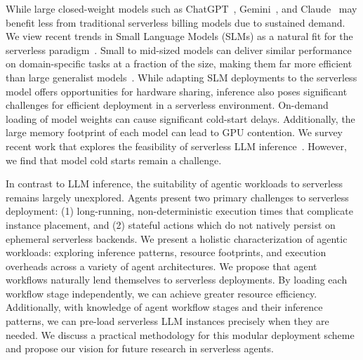 While large closed-weight models such as ChatGPT~\cite{chatgpt}, Gemini~\cite{gemini}, and Claude~\cite{claude} 
may benefit less from traditional serverless billing models due to sustained demand.
We view recent trends in Small Language Models (SLMs) as a natural fit for the serverless paradigm~\cite{belcak2025smalllanguagemodelsfuture, rios2025huggingface}.
Small to mid-sized models can deliver similar performance on domain-specific tasks at a fraction of the size, making them far more efficient than large generalist models~\cite{belcak2025smalllanguagemodelsfuture}.
While adapting SLM deployments to the serverless model offers opportunities for hardware sharing, inference also poses significant challenges for efficient deployment in a serverless environment.
On-demand loading of model weights can cause significant cold-start delays.
Additionally, the large memory footprint of each model can lead to GPU contention. %
We survey recent work that explores the feasibility of serverless LLM inference~\cite{serverlessllm, deepserve, serverlesslora, slinfer, hydraserve, wages, prewarm-not-enough, pipeboost}. However, we find that model cold starts remain a challenge.

In contrast to LLM inference, the suitability of agentic workloads to serverless remains largely unexplored.
Agents present two primary challenges to serverless deployment: 
(1) long-running, non-deterministic execution times that complicate instance placement, and 
(2) stateful actions which do not natively persist on ephemeral serverless backends.
We present a holistic characterization of agentic workloads: exploring inference patterns, resource footprints, and execution overheads across a variety of agent architectures.
We propose that agent workflows naturally lend themselves to serverless deployments.
By loading each workflow stage independently, we can achieve greater resource efficiency.
Additionally, with knowledge of agent workflow stages and their inference patterns, we can pre-load serverless LLM instances precisely when they are needed.
We discuss a practical methodology for this modular deployment scheme and propose our vision for future research in serverless agents.



